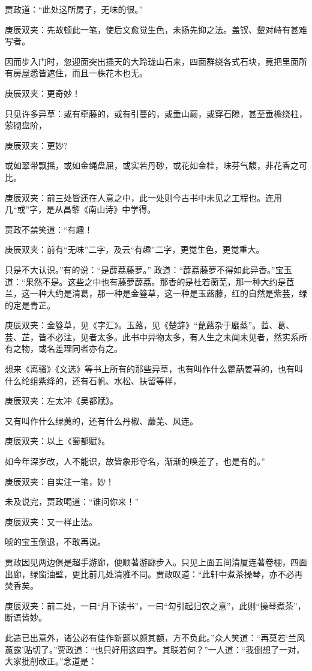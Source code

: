 \begin{parag}
    贾政道：“此处这所房子，无味的很。”\begin{note}庚辰双夹：先故顿此一笔，使后文愈觉生色，未扬先抑之法。盖钗、颦对峙有甚难写者。\end{note}因而步入门时，忽迎面突出插天的大玲珑山石来，四面群绕各式石块，竟把里面所有房屋悉皆遮住，而且一株花木也无。\begin{note}庚辰双夹：更奇妙！\end{note}只见许多异草：或有牵藤的，或有引蔓的，或垂山巅，或穿石隙，甚至垂檐绕柱，萦砌盘阶，\begin{note}庚辰双夹：更妙?\end{note}或如翠带飘摇，或如金绳盘屈，或实若丹砂，或花如金桂，味芬气馥，非花香之可比。\begin{note}庚辰双夹：前三处皆还在人意之中，此一处则今古书中未见之工程也。连用几“或”字，是从昌黎《南山诗》中学得。\end{note}贾政不禁笑道：“有趣！\begin{note}庚辰双夹：前有“无味”二字，及云“有趣”二字，更觉生色，更觉重大。\end{note}只是不大认识。”有的说：“是薜荔藤萝。” 政道：“薜荔藤萝不得如此异香。”宝玉道：“果然不是。这些之中也有藤萝薜荔。那香的是杜若蘅芜，那一种大约是茝兰，这一种大约是清葛，那一种是金簦草，这一种是玉蕗藤，红的自然是紫芸，绿的定是青芷。\begin{note}庚辰双夹：金簦草，见《字汇》。玉蕗，见《楚辞》“菎蕗杂于黀蒸”。茝、葛、芸、芷，皆不必注，见者太多。此书中异物太多，有人生之未闻未见者，然实系所有之物，或名差理同者亦有之。\end{note}想来《离骚》《文选》等书上所有的那些异草，也有叫作什么藿蒳姜荨的，也有叫什么纶组紫绛的，还有石帆、水松、扶留等样，\begin{note}庚辰双夹：左太冲《吴都赋》。\end{note}又有叫作什么绿荑的，还有什么丹椒、蘼芜、风连。\begin{note}庚辰双夹：以上《蜀都赋》。\end{note}如今年深岁改，人不能识，故皆象形夺名，渐渐的唤差了，也是有的。”\begin{note}庚辰双夹：自实注一笔，妙！\end{note}未及说完，贾政喝道：“谁问你来！”\begin{note}庚辰双夹：又一样止法。\end{note}唬的宝玉倒退，不敢再说。
\end{parag}


\begin{parag}
    贾政因见两边俱是超手游廊，便顺著游廊步入。只见上面五间清厦连著卷棚，四面出廊，绿窗油壁，更比前几处清雅不同。贾政叹道：“此轩中煮茶操琴，亦不必再焚香矣。\begin{note}庚辰双夹：前二处，一曰“月下读书”，一曰“勾引起归农之意”，此则“操琴煮茶”，断语皆妙。\end{note}此造已出意外，诸公必有佳作新题以颜其额，方不负此。”众人笑道：“再莫若‘兰风蕙露’贴切了。”贾政道：“也只好用这四字。其联若何？”一人道：“我倒想了一对，大家批削改正。”念道是：
\end{parag}



